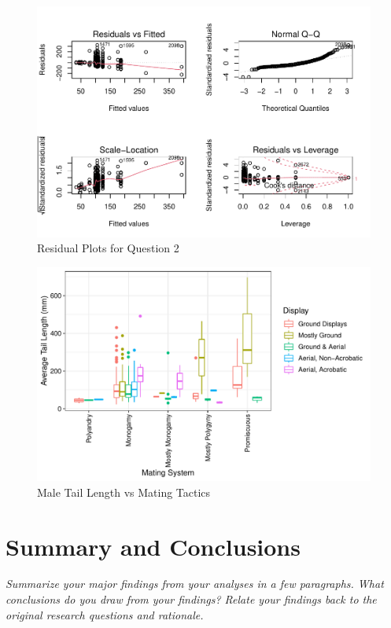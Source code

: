 \documentclass[
  12pt,
]{article}
\begin{document}
\begin{figure}
\centering
\includegraphics{Project_Code_files/figure-latex/q-2 residual-1.pdf}
\caption{Residual Plots for Question 2}
\end{figure}

\begin{figure}
\centering
\includegraphics{Project_Code_files/figure-latex/q-2 plots-1.pdf}
\caption{Male Tail Length vs Mating Tactics}
\end{figure}

\newpage

\hypertarget{summary-and-conclusions}{%
\section{Summary and Conclusions}\label{summary-and-conclusions}}

\emph{Summarize your major findings from your analyses in a few
paragraphs. What conclusions do you draw from your findings? Relate your
findings back to the original research questions and rationale.}
\end{document}
